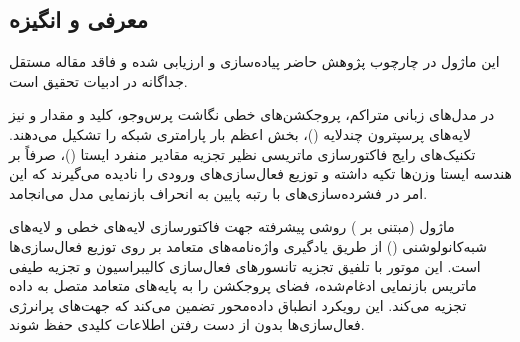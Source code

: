 \subsection{معرفی و انگیزه}
این ماژول در چارچوب پژوهش حاضر پیاده‌سازی و ارزیابی شده و فاقد مقاله مستقل جداگانه در ادبیات تحقیق است.

در مدل‌های زبانی متراکم، پروجکشن‌های خطی نگاشت پرس‌وجو، کلید و مقدار و نیز لایه‌های پرسپترون چندلایه ()، بخش اعظم بار پارامتری شبکه را تشکیل می‌دهند. تکنیک‌های رایج فاکتورسازی ماتریسی نظیر تجزیه مقادیر منفرد ایستا ()، صرفاً بر هندسه ایستا وزن‌ها تکیه داشته و توزیع فعال‌سازی‌های ورودی را نادیده می‌گیرند که این امر در فشرده‌سازی‌های با رتبه پایین به انحراف بازنمایی مدل می‌انجامد.

ماژول  (مبتنی بر ) روشی پیشرفته جهت فاکتورسازی لایه‌های خطی و لایه‌های شبه‌کانولوشنی () از طریق یادگیری واژه‌نامه‌های متعامد بر روی توزیع فعال‌سازی‌ها است. این موتور با تلفیق تجزیه  تانسورهای فعال‌سازی کالیبراسیون و تجزیه طیفی ماتریس بازنمایی ادغام‌شده، فضای پروجکشن را به پایه‌های متعامد متصل به داده تجزیه می‌کند. این رویکرد انطباق داده‌محور تضمین می‌کند که جهت‌های پرانرژی فعال‌سازی‌ها بدون از دست رفتن اطلاعات کلیدی حفظ شوند.
